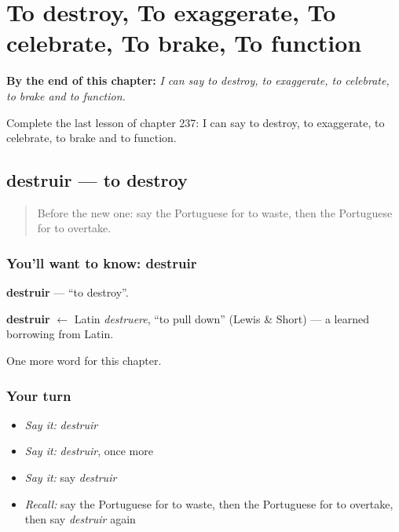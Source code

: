 
\chapter{To destroy, To exaggerate, To celebrate, To brake, To function}
\label{ch:pt-to-destroy-to-exaggerate-to-celebrate-to-brake-to-function}

\begin{chapteropening}
\textbf{By the end of this chapter:} \emph{I can say to destroy, to exaggerate, to celebrate, to brake and to function.}

Complete the last lesson of chapter 237: I can say to destroy, to exaggerate, to celebrate, to brake and to function.
\end{chapteropening}

\section[destruir]{destruir — to destroy}

\label{lesson:PT-C237-destruir}



\begin{quote}
Before the new one: say the Portuguese for to waste, then the Portuguese for to overtake.
\end{quote}

\subsection*{You'll want to know: destruir}
\textbf{destruir} — \textquotedblleft{}to destroy\textquotedblright{}.

\begin{cousinweb}
\textbf{destruir} $\leftarrow$ Latin \emph{destruere}, \textquotedblleft{}to pull down\textquotedblright{} (Lewis \& Short) — a learned borrowing from Latin.
\end{cousinweb}

\begin{grammarlens}[title={What you've built}]
One more word for this chapter.
\end{grammarlens}

\subsection*{Your turn}
\begin{itemize}
\raggedright
  \item \emph{Say it:} \emph{destruir}
  \item \emph{Say it:} \emph{destruir}, once more
  \item \emph{Say it:} say \emph{destruir}
  \item \emph{Recall:} say the Portuguese for to waste, then the Portuguese for to overtake, then say \emph{destruir} again
\end{itemize}

